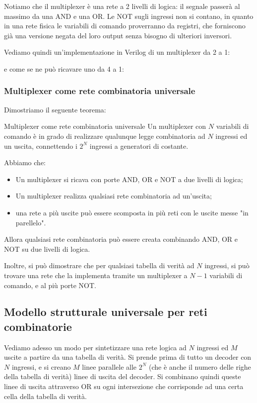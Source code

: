 \documentclass[a4paper,11pt]{article}
\begin{document}
Notiamo che il multiplexer è una rete a 2 livelli di logica: il segnale passerà al massimo da una AND e una OR.
Le NOT sugli ingressi non si contano, in quanto in una rete fisica le variabili di comando proverranno da registri, che forniscono già una versione negata del loro output senza bisogno di ulteriori inversori.

Vediamo quindi un'implementazione in Verilog di un multiplexer da 2 a 1:



e come se ne può ricavare uno da 4 a 1:



\subsubsection{Multiplexer come rete combinatoria universale}
Dimostriamo il seguente teorema:
\begin{theorem}{Multiplexer come rete combinatoria universale}	
Un multiplexer con $N$ variabili di comando è in grado di realizzare qualunque legge combinatoria ad $N$ ingressi ed un uscita, connettendo i $2^N$ ingressi a generatori di costante.
\end{theorem}

Abbiamo che:
\begin{itemize}
	\item Un multiplexer si ricava con porte AND, OR e NOT a due livelli di logica; 
	\item Un multiplexer realizza qualsiasi rete combinatoria ad un'uscita;
	\item una rete a più uscite può essere scomposta in più reti con le uscite messe "in parellelo".
\end{itemize}
Allora qualsiasi rete combinatoria può essere creata combinando AND, OR e NOT su due livelli di logica.

Inoltre, si può dimostrare che per qualsiasi tabella di verità ad $N$ ingressi, si può trovare una rete che la implementa tramite un multiplexer a $N-1$ variabili di comando, e al più porte NOT.

\subsection{Modello strutturale universale per reti combinatorie}
Vediamo adesso un modo per sintetizzare una rete logica ad $N$ ingressi ed $M$ uscite a partire da una tabella di verità.
Si prende prima di tutto un decoder con $N$ ingressi, e si creano $M$ linee parallele alle $2^N$ (che è anche il numero delle righe della tabella di verità) linee di uscita del decoder.
Si combinano quindi queste linee di uscita attraverso OR su ogni intersezione che corrisponde ad una certa cella della tabella di verità.
\end{document}

